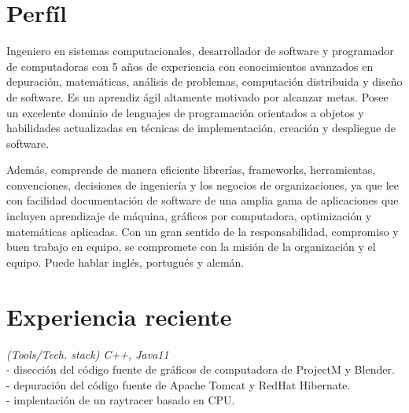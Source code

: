 \documentclass[]{CV-JuanCamiloFlorez}
\begin{document}
\begin{minipage}[t]{0.66\textwidth} 


\section{Perfíl}
\parindent=20pt Ingeniero en sistemas computacionales, desarrollador de software y programador de computadoras con 5 años de experiencia con conocimientos avanzados en depuración, matemáticas, análisis de problemas, computación distribuida y diseño de software. Es un aprendiz ágil altamente motivado por alcanzar metas. Posee un excelente dominio de lenguajes de programación orientados a objetos y habilidades actualizadas en técnicas de implementación, creación y despliegue de software.

\parindent=20pt Además, comprende de manera eficiente librerías, frameworks, herramientas, convenciones, decisiones de ingeniería y los negocios de organizaciones, ya que lee con facilidad documentación de software de una amplia gama de aplicaciones que incluyen aprendizaje de máquina, gráficos por computadora, optimización y matemáticas aplicadas. Con un gran sentido de la responsabilidad, compromiso y buen trabajo en equipo, se compromete con la misión de la organización y el equipo. Puede hablar inglés, portugués y alemán.

\sectionsep

\section{Experiencia reciente}
    \noindent
    \textit{(Tools/Tech. stack) C++, Java11} \\
        - disección del código fuente de gráficos de computadora de ProjectM y Blender. \\
        - depuración del código fuente de Apache Tomcat y RedHat Hibernate. \\
        - implentación de un raytracer basado en CPU. \\
        \sectionsep


\end{minipage}
\end{document}
